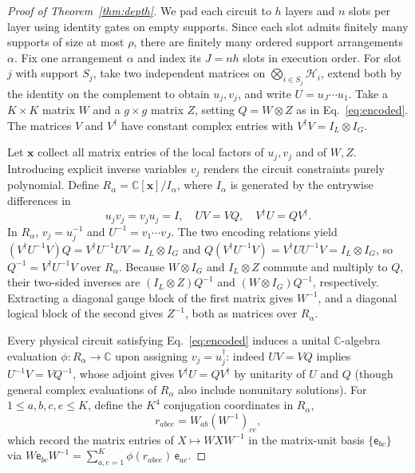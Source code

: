 \documentclass[aps,prl,reprint,notitlepage,nofootinbib,nobibnotes]{revtex4-2}
\newcommand{\HH}{\mathcal H}
\newcommand{\id}{I}
\begin{document}
\begin{proof}[Proof of Theorem~\ref{thm:depth}]
We pad each circuit to \(h\) layers and \(n\) slots per layer using identity gates on empty supports. Since each slot admits finitely many supports of size at most \(\rho\), there are finitely many ordered support arrangements \(\alpha\). Fix one arrangement \(\alpha\) and index its \(J=nh\) slots in execution order. For slot \(j\) with support \(S_j\), take two independent matrices on \(\bigotimes_{i\in S_j}\HH_i\), extend both by the identity on the complement to obtain \(u_j,v_j\), and write \(U=u_J\cdots u_1\). Take a \(K\times K\) matrix \(W\) and a \(g\times g\) matrix \(Z\), setting \(Q=W\otimes Z\) as in Eq.~\eqref{eq:encoded}. The matrices \(V\) and \(V^\dagger\) have constant complex entries with \(V^\dagger V=\id_L\otimes\id_G\).

Let \(\mathbf x\) collect all matrix entries of the local factors of \(u_j,v_j\) and of \(W,Z\). Introducing explicit inverse variables \(v_j\) renders the circuit constraints purely polynomial. Define \(R_\alpha=\mathbb C[\mathbf x]/I_\alpha\), where \(I_\alpha\) is generated by the entrywise differences in
\begin{equation}
 u_jv_j=v_ju_j=\id,\quad UV=VQ,\quad V^\dagger U=QV^\dagger.\label{eq:algebraic-encoding}
\end{equation}
In \(R_\alpha\), \(v_j=u_j^{-1}\) and \(U^{-1}=v_1\cdots v_J\). The two encoding relations yield \((V^\dagger U^{-1}V)Q=V^\dagger U^{-1}UV=\id_L\otimes\id_G\) and \(Q(V^\dagger U^{-1}V)=V^\dagger UU^{-1}V=\id_L\otimes\id_G\), so \(Q^{-1}=V^\dagger U^{-1}V\) over \(R_\alpha\). Because \(W\otimes\id_G\) and \(\id_L\otimes Z\) commute and multiply to \(Q\), their two-sided inverses are \((\id_L\otimes Z)Q^{-1}\) and \((W\otimes\id_G)Q^{-1}\), respectively. Extracting a diagonal gauge block of the first matrix gives \(W^{-1}\), and a diagonal logical block of the second gives \(Z^{-1}\), both as matrices over \(R_\alpha\).

Every physical circuit satisfying Eq.~\eqref{eq:encoded} induces a unital \(\mathbb C\)-algebra evaluation \(\phi:R_\alpha\to\mathbb C\) upon assigning \(v_j=u_j^\dagger\): indeed \(UV=VQ\) implies \(U^{-1}V=VQ^{-1}\), whose adjoint gives \(V^\dagger U=QV^\dagger\) by unitarity of \(U\) and \(Q\) (though general complex evaluations of \(R_\alpha\) also include nonunitary solutions). For \(1\le a,b,c,e\le K\), define the \(K^4\) conjugation coordinates in \(R_\alpha\),
\begin{equation}\label{eq:conjugation-coordinates}
 r_{abce}=W_{ab}(W^{-1})_{ce},
\end{equation}
which record the matrix entries of \(X\mapsto WXW^{-1}\) in the matrix-unit basis \(\{\mathsf e_{bc}\}\) via \(W\mathsf e_{bc}W^{-1}=\sum_{a,e=1}^{K}\phi(r_{abce})\,\mathsf e_{ae}\).


\end{proof}
\end{document}
